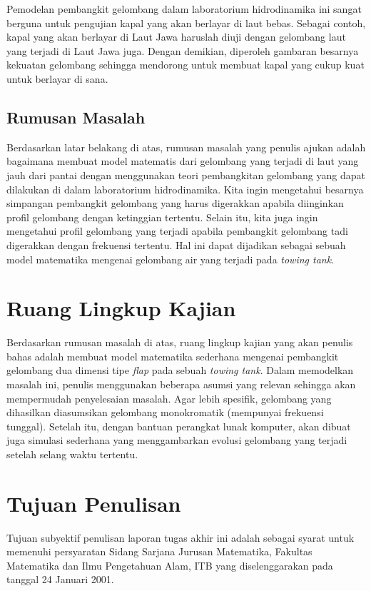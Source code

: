 \documentclass[12pt,a4paper]{report}
\begin{document}
Pemodelan pembangkit gelombang dalam laboratorium hidrodinamika ini sangat
berguna untuk pengujian kapal yang akan berlayar di laut bebas. Sebagai
contoh, kapal yang akan berlayar di Laut Jawa haruslah diuji dengan
gelombang laut yang terjadi di Laut Jawa juga. Dengan demikian, diperoleh
gambaran besarnya kekuatan gelombang sehingga mendorong untuk membuat kapal
yang cukup kuat untuk berlayar di sana.

\subsection{Rumusan Masalah}

Berdasarkan latar belakang di atas, rumusan masalah yang penulis
ajukan adalah bagaimana membuat model matematis dari gelombang
yang terjadi di laut yang jauh dari pantai dengan menggunakan
teori pembangkitan gelombang yang dapat dilakukan di dalam
laboratorium hidrodinamika. Kita ingin mengetahui besarnya
simpangan pembangkit gelombang yang harus digerakkan apabila
diinginkan profil gelombang dengan ketinggian tertentu. Selain
itu, kita juga ingin mengetahui profil gelombang yang terjadi
apabila pembangkit gelombang tadi digerakkan dengan frekuensi
tertentu. Hal ini dapat dijadikan sebagai sebuah model matematika
mengenai gelombang air yang terjadi pada \textit{towing tank}.

\section{Ruang Lingkup Kajian}

Berdasarkan rumusan masalah di atas, ruang lingkup kajian yang
akan penulis bahas adalah membuat model matematika sederhana
mengenai pembangkit gelombang dua dimensi tipe \textit{flap} pada
sebuah \textit{towing tank}. Dalam memodelkan masalah ini, penulis
menggunakan beberapa asumsi yang relevan sehingga akan
mempermudah penyelesaian masalah. Agar lebih spesifik, gelombang
yang dihasilkan diasumsikan gelombang monokromatik (mempunyai
frekuensi tunggal). Setelah itu, dengan bantuan perangkat lunak
komputer, akan dibuat juga simulasi sederhana yang menggambarkan
evolusi gelombang yang terjadi setelah selang waktu tertentu.

\section{Tujuan Penulisan}

Tujuan subyektif penulisan laporan tugas akhir ini adalah sebagai
syarat untuk memenuhi persyaratan Sidang Sarjana Jurusan
Matematika, Fakultas Matematika dan Ilmu Pengetahuan Alam, ITB
yang diselenggarakan pada tanggal 24 Januari 2001.\newline
\end{document}

